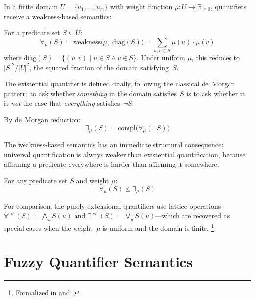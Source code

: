 \documentclass[11pt,openany]{report}
\begin{document}
In a finite domain $U = \{u_1, \ldots, u_m\}$ with weight function
$\mu : U \to \mathbb{R}_{\ge 0}$, quantifiers receive a
weakness-based semantics:

\begin{definition}
For a predicate set $S \subseteq U$:
\[
  \forall_\mu(S) = \mathrm{weakness}\big(\mu,\; \mathrm{diag}(S)\big)
  = \sum_{u, v \in S} \mu(u) \cdot \mu(v)
\]
where $\mathrm{diag}(S) = \{(u,v) \mid u \in S \wedge v \in S\}$.
Under uniform $\mu$, this reduces to $|S|^2/|U|^2$, the squared fraction
of the domain satisfying~$S$.
\end{definition}

The existential quantifier is defined dually, following the classical
de~Morgan pattern: to ask whether \emph{something} in the domain
satisfies~$S$ is to ask whether it is \emph{not} the case that
\emph{everything} satisfies~$\neg S$.

\begin{definition}
By de~Morgan reduction:
\[
  \exists_\mu(S) = \mathrm{compl}\big(\forall_\mu(\neg S)\big)
\]
\end{definition}

The weakness-based semantics has an immediate structural consequence:
universal quantification is always weaker than existential quantification,
because affirming a predicate everywhere is harder than affirming it
somewhere.

\begin{theorem}
For any predicate set $S$ and weight $\mu$:
\[
  \forall_\mu(S) \le \exists_\mu(S)
\]
\end{theorem}

For comparison, the purely extensional quantifiers use lattice
operations---$\forall^{\mathrm{ext}}(S) = \bigwedge_u S(u)$
and $\exists^{\mathrm{ext}}(S) = \bigvee_u S(u)$---which are recovered
as special cases when the weight~$\mu$ is uniform and the domain is
finite.%
\footnote{Formalized in 
  and .}

\section{Fuzzy Quantifier Semantics}
\end{document}
